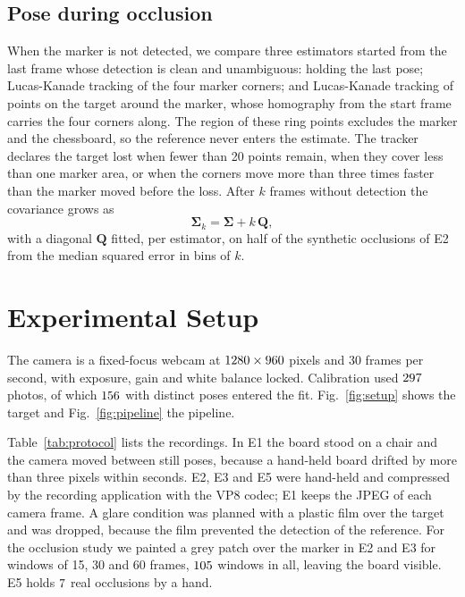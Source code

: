 \documentclass[conference]{IEEEtran}
\newcommand{\vect}[1]{\mathbf{#1}}
\begin{document}
\subsection{Pose during occlusion}
When the marker is not detected, we compare three estimators started from the last frame whose
detection is clean and unambiguous: holding the last pose; Lucas-Kanade tracking of the four marker
corners; and Lucas-Kanade tracking of points on the target around the marker, whose homography from the
start frame carries the four corners along. The region of these ring points excludes the marker and
the chessboard, so the reference never enters the estimate. The tracker declares the target lost when
fewer than 20 points remain, when they cover less than one marker area, or when the corners move more
than three times faster than the marker moved before the loss. After $k$ frames without detection the
covariance grows as
\begin{equation}
\boldsymbol{\Sigma}_k = \boldsymbol{\Sigma} + k\,\vect{Q},
\end{equation}
with a diagonal $\vect{Q}$ fitted, per estimator, on half of the synthetic occlusions of E2 from the
median squared error in bins of $k$.

\section{Experimental Setup}
The camera is a fixed-focus webcam at $1280\times960$ pixels and 30 frames per second, with
exposure, gain and white balance locked. Calibration used $297$ photos, of which
$156$ with distinct poses entered the fit. Fig.~\ref{fig:setup} shows the target and
Fig.~\ref{fig:pipeline} the pipeline.

Table~\ref{tab:protocol} lists the recordings. In E1 the board stood on a chair and the camera moved
between still poses, because a hand-held board drifted by more than three pixels within seconds. E2,
E3 and E5 were hand-held and compressed by the recording application with the VP8 codec; E1 keeps the
JPEG of each camera frame. A glare condition was planned with a plastic film over the target and was
dropped, because the film prevented the detection of the reference. For the occlusion study we painted
a grey patch over the marker in E2 and E3 for windows of 15, 30 and 60 frames, $105$ windows in
all, leaving the board visible. E5 holds $7$ real occlusions by a hand.
\end{document}
